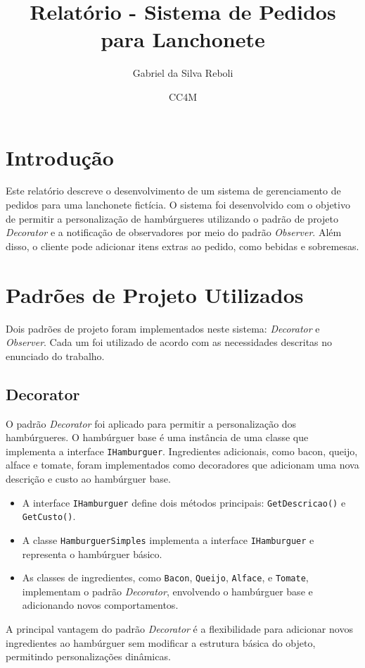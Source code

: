 \documentclass[a4paper,12pt]{article}
\title{Relatório - Sistema de Pedidos para Lanchonete}
\author{Gabriel da Silva Reboli}
\date{CC4M}
\begin{document}
\maketitle

\section{Introdução}
Este relatório descreve o desenvolvimento de um sistema de gerenciamento de pedidos para uma lanchonete fictícia. O sistema foi desenvolvido com o objetivo de permitir a personalização de hambúrgueres utilizando o padrão de projeto \textit{Decorator} e a notificação de observadores por meio do padrão \textit{Observer}. Além disso, o cliente pode adicionar itens extras ao pedido, como bebidas e sobremesas.

\section{Padrões de Projeto Utilizados}
Dois padrões de projeto foram implementados neste sistema: \textit{Decorator} e \textit{Observer}. Cada um foi utilizado de acordo com as necessidades descritas no enunciado do trabalho.

\subsection{Decorator}
O padrão \textit{Decorator} foi aplicado para permitir a personalização dos hambúrgueres. O hambúrguer base é uma instância de uma classe que implementa a interface \texttt{IHamburguer}. Ingredientes adicionais, como bacon, queijo, alface e tomate, foram implementados como decoradores que adicionam uma nova descrição e custo ao hambúrguer base.

\begin{itemize}
    \item A interface \texttt{IHamburguer} define dois métodos principais: \texttt{GetDescricao()} e \texttt{GetCusto()}.
    \item A classe \texttt{HamburguerSimples} implementa a interface \texttt{IHamburguer} e representa o hambúrguer básico.
    \item As classes de ingredientes, como \texttt{Bacon}, \texttt{Queijo}, \texttt{Alface}, e \texttt{Tomate}, implementam o padrão \textit{Decorator}, envolvendo o hambúrguer base e adicionando novos comportamentos.
\end{itemize}

A principal vantagem do padrão \textit{Decorator} é a flexibilidade para adicionar novos ingredientes ao hambúrguer sem modificar a estrutura básica do objeto, permitindo personalizações dinâmicas.
\end{document}
